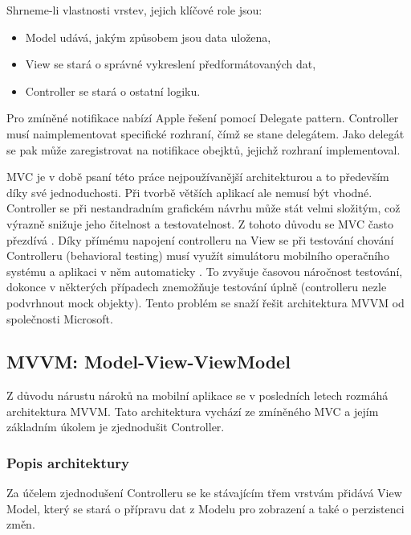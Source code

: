 Shrneme-li vlastnosti vrstev, jejich klíčové role jsou:

\begin{itemize}
  \item Model udává, jakým způsobem jsou data uložena,
  \item View se stará o správné vykreslení předformátovaných dat,
  \item Controller se stará o ostatní logiku.
\end{itemize}

Pro zmíněné notifikace nabízí Apple řešení pomocí Delegate pattern.
Controller musí naimplementovat specifické rozhraní, čímž se stane delegátem.
Jako delegát se pak může zaregistrovat na notifikace obejktů, jejichž rozhraní implementoval.

MVC je v době psaní této práce nejpoužívanější architekturou a to především díky své jednoduchosti.
Při tvorbě větších aplikací ale nemusí být vhodné.
Controller se při nestandradním grafickém návrhu může stát velmi složitým, což výrazně snižuje jeho čitelnost a testovatelnost.
Z tohoto důvodu se MVC často přezdívá .
Díky přímému napojení controlleru na View se při testování chování Controlleru (behavioral testing) musí využít simulátoru mobilního operačního systému a aplikaci v něm automaticky .
To zvyšuje časovou náročnost testování, dokonce v některých případech znemožňuje testování úplně (controlleru nezle podvrhnout mock objekty).
Tento problém se snaží řešit architektura MVVM od společnosti Microsoft.

\subsection{MVVM: Model-View-ViewModel}\label{analyza-mvvm}

Z důvodu nárustu nároků na mobilní aplikace se v posledních letech rozmáhá architektura MVVM.
Tato architektura vychází ze zmíněného MVC a jejím základním úkolem je zjednodušit Controller.

\subsubsection{Popis architektury}

Za účelem zjednodušení Controlleru se ke stávajícím třem vrstvám přidává View Model, který se stará o přípravu dat z Modelu pro zobrazení a také o perzistenci změn.


